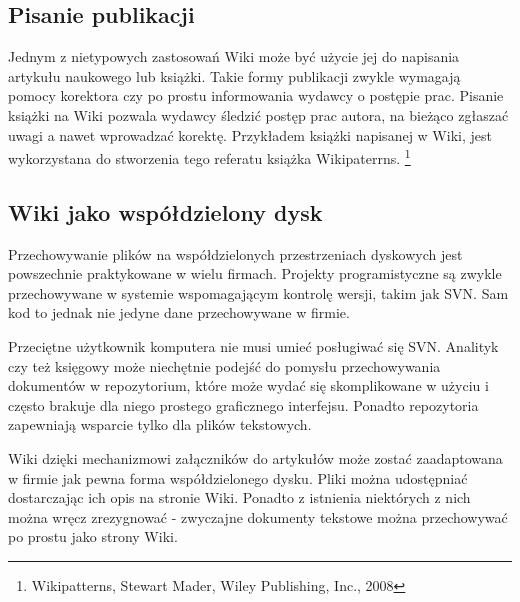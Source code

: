 \documentclass{article}
\begin{document}

	\subsection{Pisanie publikacji}

		Jednym z nietypowych zastosowań Wiki może być użycie jej do napisania artykułu naukowego lub książki. Takie formy publikacji zwykle wymagają pomocy korektora czy po prostu informowania wydawcy o postępie prac. Pisanie książki na Wiki pozwala wydawcy śledzić postęp prac autora, na bieżąco zgłaszać uwagi a nawet wprowadzać korektę. Przykładem książki napisanej w Wiki, jest wykorzystana  do stworzenia tego referatu książka Wikipaterrns. \footnote{Wikipatterns, Stewart Mader, Wiley Publishing, Inc., 2008}


	\subsection{Wiki jako współdzielony dysk}
		Przechowywanie plików na współdzielonych przestrzeniach dyskowych jest powszechnie praktykowane w wielu firmach. Projekty programistyczne są zwykle przechowywane w systemie wspomagającym kontrolę wersji, takim jak SVN. Sam kod to jednak nie jedyne dane przechowywane w firmie. 

		Przeciętne użytkownik komputera nie musi umieć posługiwać się SVN. Analityk czy też księgowy może niechętnie podejść do pomysłu przechowywania dokumentów w repozytorium, które może wydać się skomplikowane w użyciu i często brakuje dla niego prostego graficznego interfejsu. Ponadto repozytoria zapewniają wsparcie tylko dla plików tekstowych. 

		Wiki dzięki mechanizmowi załączników do artykułów może zostać zaadaptowana w firmie jak pewna forma współdzielonego dysku. Pliki można udostępniać dostarczając ich opis na stronie Wiki. Ponadto z istnienia niektórych z nich można wręcz zrezygnować - zwyczajne dokumenty tekstowe można przechowywać po prostu jako strony Wiki.
\end{document}
